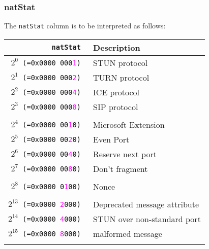 \documentclass[documentation]{subfiles}
\begin{document}
\subsubsection{natStat}\label{natStat}
The {\tt natStat} column is to be interpreted as follows:%
    \begin{longtable}{>{\tt}rl}
        \toprule
        {\bf natStat} & {\bf Description}\\
        \midrule\endhead%
        $2^{0}$  (=0x0000 000\textcolor{magenta}{1}) & STUN protocol\\
        $2^{1}$  (=0x0000 000\textcolor{magenta}{2}) & TURN protocol\\
        $2^{2}$  (=0x0000 000\textcolor{magenta}{4}) & ICE protocol\\
        $2^{3}$  (=0x0000 000\textcolor{magenta}{8}) & SIP protocol\\
        \\
        $2^{4}$  (=0x0000 00\textcolor{magenta}{1}0) & Microsoft Extension\\
        $2^{5}$  (=0x0000 00\textcolor{magenta}{2}0) & Even Port\\
        $2^{6}$  (=0x0000 00\textcolor{magenta}{4}0) & Reserve next port\\
        $2^{7}$  (=0x0000 00\textcolor{magenta}{8}0) & Don't fragment\\
        \\
        $2^{8}$  (=0x0000 0\textcolor{magenta}{1}00) & Nonce\\
        \\
        $2^{13}$ (=0x0000 \textcolor{magenta}{2}000) & Deprecated message attribute\\
        $2^{14}$ (=0x0000 \textcolor{magenta}{4}000) & STUN over non-standard port\\
        $2^{15}$ (=0x0000 \textcolor{magenta}{8}000) & malformed message\\
        \\

\end{longtable}
\end{document}
